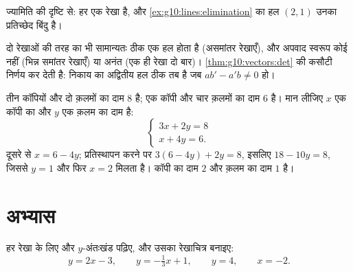 \begin{omfigure}

{\small {} ज्यामिति की दृष्टि से: हर  एक रेखा है, और \cref{ex:g10:lines:elimination} का
हल $(2,1)$ उनका प्रतिच्छेद बिंदु है।}
\end{omfigure}

\begin{remark}[कितने हल?]
दो रेखाओं की तरह  का भी सामान्यतः ठीक एक हल होता है (असमांतर
रेखाएँ), और अपवाद स्वरूप कोई नहीं (भिन्न समांतर रेखाएँ) या अनंत (एक ही रेखा
दो बार)। \cref{thm:g10:vectors:det} की कसौटी निर्णय कर देती है: निकाय का अद्वितीय हल ठीक तब है जब
$ab' - a'b \neq 0$ हो।
\end{remark}

\begin{example}[निकाय से प्रतिरूपण]\label{ex:g10:lines:modeling}
तीन कॉपियों और दो क़लमों का दाम $8$ है; एक कॉपी और चार क़लमों का दाम $6$
है। मान लीजिए $x$ एक कॉपी का और $y$ एक क़लम का दाम है:
\[
\begin{cases}
3x + 2y = 8 \\
x + 4y = 6 .
\end{cases}
\]
दूसरे  से $x = 6 - 4y$; प्रतिस्थापन करने पर $3(6 - 4y) + 2y = 8$, इसलिए $18 - 10y = 8$, जिससे $y = 1$
और फिर $x = 2$ मिलता है। कॉपी का दाम $2$ और क़लम का दाम $1$ है।
\end{example}

\section{अभ्यास}

\begin{exercise}[$\star$]\label{exo:g10:lines:1}
हर रेखा के लिए  और $y$-अंतःखंड पढ़िए, और उसका रेखाचित्र बनाइए:
\[
y = 2x - 3, \qquad
y = -\tfrac13 x + 1, \qquad
y = 4, \qquad
x = -2 .
\]
\end{exercise}

